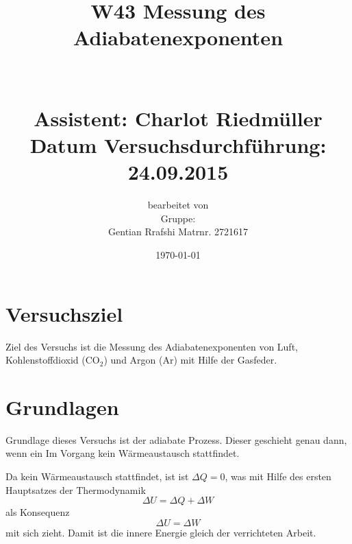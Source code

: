 \documentclass[fontsize=12pt]{scrartcl}
\begin{document}
\begin{minipage}{0.9\textwidth}
\begin{center}\large
\title{ W43 Messung des Adiabatenexponenten \\
		~\\
		~\\
		Assistent: Charlot Riedmüller \\
		Datum Versuchsdurchführung: \\
		24.09.2015}

\author{bearbeitet von\\
		Gruppe: \\
		Gentian Rrafshi Matrnr. 2721617}
\date{\today}

\maketitle

\end{center}
\end{minipage}

\newpage

\tableofcontents

\newpage
\noindent

\section{ Versuchsziel}

Ziel des Versuchs ist die Messung des Adiabatenexponenten von Luft, Kohlenstoffdioxid (CO$_2$) und Argon (Ar) mit Hilfe der Gasfeder.

\section{ Grundlagen}

Grundlage dieses Versuchs ist der adiabate Prozess. Dieser geschieht genau dann, wenn ein Im Vorgang kein Wärmeaustausch stattfindet. \par

Da kein Wärmeaustausch stattfindet, ist ist $\Delta Q =0$, was mit Hilfe des ersten Hauptsatzes der Thermodynamik
\begin{equation}
\Delta U = \Delta Q + \Delta W
\end{equation}
als Konsequenz 
\begin{equation}
\Delta U =  \Delta W
\end{equation}
mit sich zieht. Damit ist die innere Energie gleich der verrichteten Arbeit. \par
\end{document}
